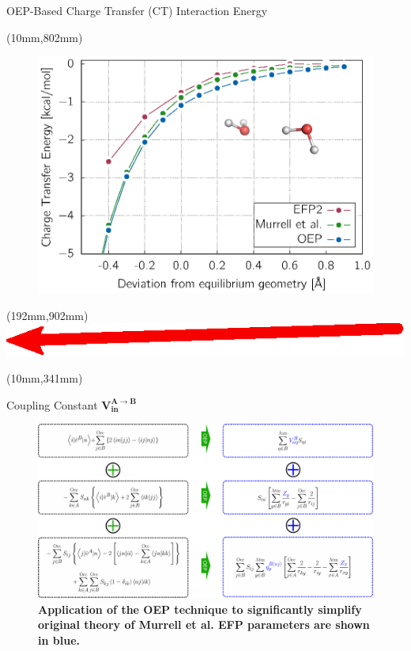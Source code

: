 \documentclass[final]{beamer} %
\begin{document}
\begin{frame}{OEP-Based Charge Transfer (CT) Interaction Energy}
\begin{textblock*}{340mm}(10mm,802mm)
\begin{figure}
\includegraphics[width=1.0\textwidth]{fig-1-s.eps}
\end{figure}
\end{textblock*}

\begin{textblock*}{60mm}(192mm,902mm)
\includegraphics[scale=0.4]{arrow.eps}
\end{textblock*}

\begin{textblock*}{820mm}(10mm,341mm)
\begin{exampleblock}{Coupling Constant $\boldsymbol{ V_{in}^{A\rightarrow B} } $}
\begin{figure}
\includegraphics[width=1.0\textwidth]{scheme.eps}
\caption{\bf Application of the OEP technique to significantly simplify original theory of Murrell et al. EFP parameters
are shown in blue.}
\end{figure}
\end{exampleblock}
\end{textblock*}


\end{frame}
\end{document}
